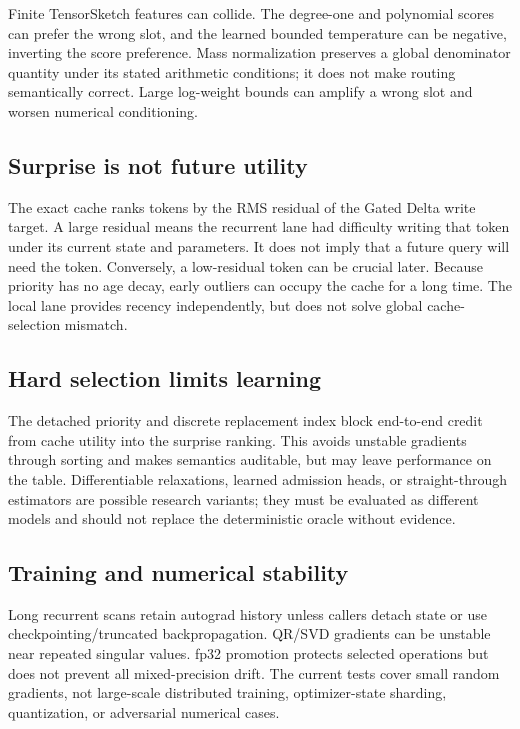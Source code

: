 Finite TensorSketch features can collide. The degree-one and polynomial
scores can prefer the wrong slot, and the learned bounded temperature can be
negative, inverting the score preference. Mass normalization preserves a
global denominator quantity under its stated arithmetic conditions; it does
not make routing semantically correct. Large log-weight bounds can amplify a
wrong slot and worsen numerical conditioning.

\subsection{Surprise is not future utility}

The exact cache ranks tokens by the RMS residual of the Gated Delta write
target. A large residual means the recurrent lane had difficulty writing that
token under its current state and parameters. It does not imply that a future
query will need the token. Conversely, a low-residual token can be crucial
later. Because priority has no age decay, early outliers can occupy the cache
for a long time. The local lane provides recency independently, but does not
solve global cache-selection mismatch.

\subsection{Hard selection limits learning}

The detached priority and discrete replacement index block end-to-end credit
from cache utility into the surprise ranking. This avoids unstable gradients
through sorting and makes semantics auditable, but may leave performance on
the table. Differentiable relaxations, learned admission heads, or
straight-through estimators are possible research variants; they must be
evaluated as different models and should not replace the deterministic oracle
without evidence.

\subsection{Training and numerical stability}

Long recurrent scans retain autograd history unless callers detach state or
use checkpointing/truncated backpropagation. QR/SVD gradients can be unstable
near repeated singular values. fp32 promotion protects selected operations but
does not prevent all mixed-precision drift. The current tests cover small
random gradients, not large-scale distributed training, optimizer-state
sharding, quantization, or adversarial numerical cases.

